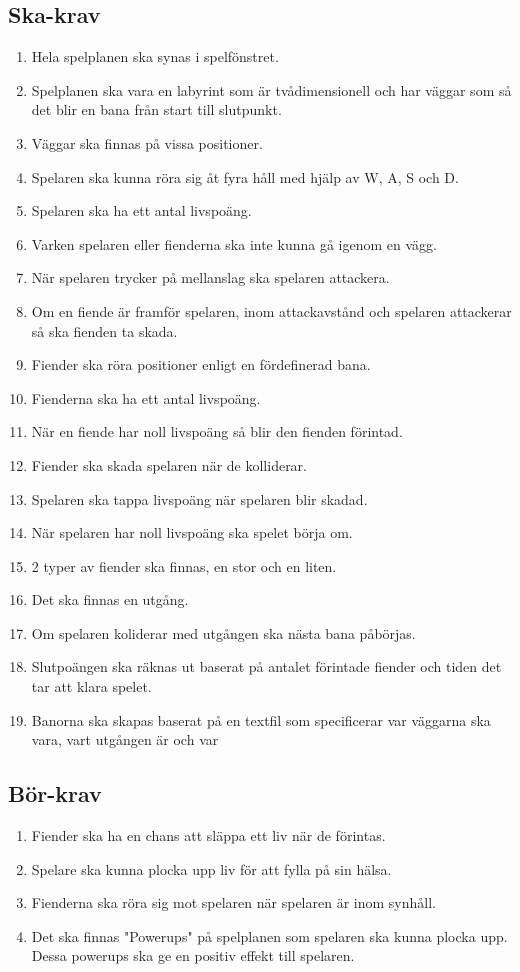 \documentclass{TDP005mall}
\begin{document}
\subsection{Ska-krav}
\begin{enumerate}
  \item Hela spelplanen ska synas i spelfönstret.
  \item Spelplanen ska vara en labyrint som är tvådimensionell och har väggar som så det blir en bana från start till slutpunkt.
  \item Väggar ska finnas på vissa positioner.
  \item Spelaren ska kunna röra sig åt fyra håll med hjälp av W, A, S och D.
  \item Spelaren ska ha ett antal livspoäng.
  \item Varken spelaren eller fienderna ska inte kunna gå igenom en vägg.
  \item När spelaren trycker på mellanslag ska spelaren attackera.
  \item Om en fiende är framför spelaren, inom attackavstånd och spelaren attackerar så ska fienden ta skada.
  \item Fiender ska röra positioner enligt en fördefinerad bana.
  \item Fienderna ska ha ett antal livspoäng.
  \item När en fiende har noll livspoäng så blir den fienden förintad.
  \item Fiender ska skada spelaren när de kolliderar.
  \item Spelaren ska tappa livspoäng när spelaren blir skadad.
  \item När spelaren har noll livspoäng ska spelet börja om.
  \item 2 typer av fiender ska finnas, en stor och en liten.
  \item Det ska finnas en utgång.
  \item Om spelaren koliderar med utgången ska nästa bana påbörjas.
  \item Slutpoängen ska räknas ut baserat på antalet förintade fiender och tiden det tar att klara spelet.
  \item Banorna ska skapas baserat på en textfil som specificerar var väggarna ska vara, vart utgången är och var 
\end{enumerate}

\subsection{Bör-krav}
\begin{enumerate}
  \item Fiender ska ha en chans att släppa ett liv när de förintas.
  \item Spelare ska kunna plocka upp liv för att fylla på sin hälsa.
  \item Fienderna ska röra sig mot spelaren när spelaren är inom synhåll.
  \item Det ska finnas "Powerups" på spelplanen som spelaren ska kunna plocka upp. Dessa powerups ska ge en positiv effekt till spelaren.
\end{enumerate}
\end{document}
